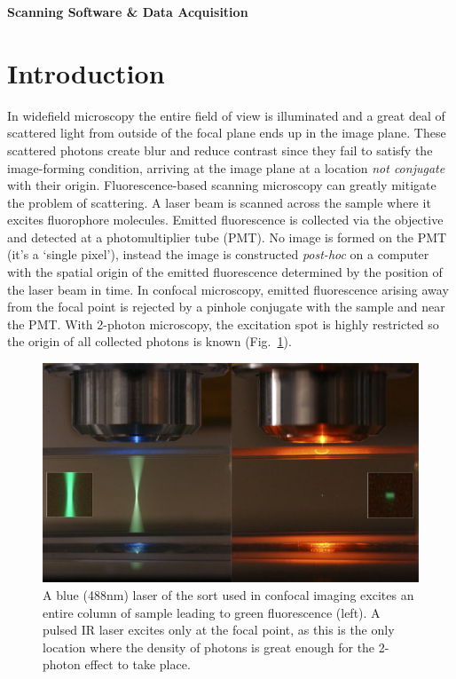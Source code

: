 \documentclass[a4paper]{report}
\begin{document}
\setcounter{secnumdepth}{2}

\begin{center}
\textbf{\Large{Scanning Software \& Data Acquisition}}
\end{center}

\section{Introduction}

In widefield microscopy the entire field of view is illuminated and a great deal of scattered light from outside of the focal plane ends up in the image plane. 
These scattered photons create blur and reduce contrast since they fail to satisfy the image-forming condition, arriving at the image plane at a location \textit{not conjugate} with their origin.
Fluorescence-based scanning microscopy can greatly mitigate the problem of scattering. 
A laser beam is scanned across the sample where it excites fluorophore molecules. 
Emitted fluorescence is collected via the objective and detected at a photomultiplier tube (PMT). 
No image is formed on the PMT (it's a `single pixel'), instead the image is constructed \textit{post-hoc} on a computer with the spatial origin of the emitted fluorescence determined by the position of the laser beam in time.
In confocal microscopy, emitted fluorescence arising away from the focal point is rejected by a pinhole conjugate with the sample and near the PMT. 
With 2-photon microscopy, the excitation spot is highly restricted so the origin of all collected photons is known (Fig.~\ref{1pvs2p}). 

\begin{figure}[h]
\centering
\includegraphics[width=4.5in]{1Pvs2PFluorescence.png}
\caption{A blue (488nm) laser of the sort used in confocal imaging excites an entire column of sample leading to green fluorescence (left).
A pulsed IR laser excites only at the focal point, as this is the only location where the density of photons is great enough for the 2-photon effect to take place.}
\label{1pvs2p}
\end{figure}
\end{document}
